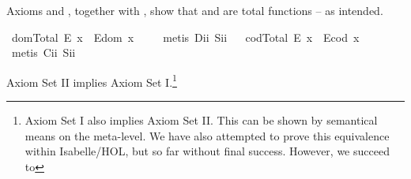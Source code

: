 \begin{isabellebody}
%
\begin{isamarkuptext}%
Axioms  and , together with , show that
 and  are total functions -- as intended.%
\end{isamarkuptext}\isamarkuptrue%
\isamarkupfalse%
\ domTotal{\isacharcolon}\ {\isachardoublequoteopen}E\ x\ \isactrlbold {\isasymrightarrow}\ E{\isacharparenleft}dom\ x{\isacharparenright}{\isachardoublequoteclose}\ \isanewline
%
\isadelimproof
\ \ %
\endisadelimproof
%
\isatagproof
{}\isamarkupfalse%
\ {\isacharparenleft}metis\ D\isactrlsub i\isactrlsub i\ S\isactrlsub i\isactrlsub i{\isacharparenright}%
\endisatagproof
{\isafoldproof}%
%
\isadelimproof
\ \isanewline
%
\endisadelimproof
{}\isamarkupfalse%
\ codTotal{\isacharcolon}\ {\isachardoublequoteopen}E\ x\ \isactrlbold {\isasymrightarrow}\ E{\isacharparenleft}cod\ x{\isacharparenright}{\isachardoublequoteclose}\ \isanewline
%
\isadelimproof
\ \ %
\endisadelimproof
%
\isatagproof
{}\isamarkupfalse%
\ {\isacharparenleft}metis\ C\isactrlsub i\isactrlsub i\ S\isactrlsub i\isactrlsub i{\isacharparenright}%
\endisatagproof
{\isafoldproof}%
%
\isadelimproof
%
\endisadelimproof
%
\begin{isamarkuptext}%
Axiom Set II implies Axiom Set I.\footnote{Axiom Set I also implies Axiom Set II. This can 
be shown by semantical means on the meta-level. We have also attempted to prove this equivalence 
within Isabelle/HOL, but so far without final success. However, we succeed to 
}
\end{isamarkuptext}
\end{isabellebody}
